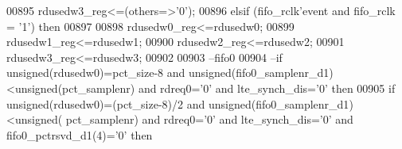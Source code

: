 \begin{DoxyCode}
00895           \textcolor{vhdlchar}{rdusedw3_reg}\textcolor{vhdlchar}{<=}\textcolor{vhdlchar}{(}\textcolor{keywordflow}{others}\textcolor{vhdlchar}{=}\textcolor{vhdlchar}{>}\textcolor{vhdlchar}{'}\textcolor{vhdllogic}{}\textcolor{vhdllogic}{0}\textcolor{vhdlchar}{'}\textcolor{vhdlchar}{)};
00896         \textcolor{keywordflow}{elsif} \textcolor{vhdlchar}{(}\textcolor{vhdlchar}{fifo_rclk}\textcolor{vhdlchar}{'}\textcolor{vhdlkeyword}{event} \textcolor{keywordflow}{and} \textcolor{vhdlchar}{fifo_rclk} \textcolor{vhdlchar}{=} \textcolor{vhdlchar}{'}\textcolor{vhdllogic}{}\textcolor{vhdllogic}{1}\textcolor{vhdlchar}{'}\textcolor{vhdlchar}{)} \textcolor{keywordflow}{then}
00897 
00898          \textcolor{vhdlchar}{rdusedw0_reg}\textcolor{vhdlchar}{<=}\textcolor{vhdlchar}{rdusedw0};
00899         \textcolor{vhdlchar}{rdusedw1_reg}\textcolor{vhdlchar}{<=}\textcolor{vhdlchar}{rdusedw1};
00900         \textcolor{vhdlchar}{rdusedw2_reg}\textcolor{vhdlchar}{<=}\textcolor{vhdlchar}{rdusedw2};
00901           \textcolor{vhdlchar}{rdusedw3_reg}\textcolor{vhdlchar}{<=}\textcolor{vhdlchar}{rdusedw3};
00902          
00903 \textcolor{keyword}{            --fifo0}
00904 \textcolor{keyword}{          --if unsigned(rdusedw0)=pct\_size-8 and unsigned(fifo0\_samplenr\_d1)<unsigned(pct\_samplenr) and
       rdreq0='0' and lte\_synch\_dis='0' then }
00905            \textcolor{keywordflow}{if} \textcolor{comment}{unsigned}\textcolor{vhdlchar}{(}\textcolor{vhdlchar}{rdusedw0}\textcolor{vhdlchar}{)}\textcolor{vhdlchar}{=}\textcolor{vhdlchar}{(}\textcolor{vhdlchar}{pct_size}\textcolor{vhdlchar}{-}\textcolor{vhdllogic}{}\textcolor{vhdllogic}{8}\textcolor{vhdlchar}{)}\textcolor{vhdlchar}{/}\textcolor{vhdllogic}{}\textcolor{vhdllogic}{2} \textcolor{keywordflow}{and} \textcolor{comment}{unsigned}\textcolor{vhdlchar}{(}\textcolor{vhdlchar}{fifo0_samplenr_d1}\textcolor{vhdlchar}{)}\textcolor{vhdlchar}{<}\textcolor{comment}{unsigned}\textcolor{vhdlchar}{(}\textcolor{vhdlchar}{
      pct_samplenr}\textcolor{vhdlchar}{)} \textcolor{keywordflow}{and} \textcolor{vhdlchar}{rdreq0}\textcolor{vhdlchar}{=}\textcolor{vhdlchar}{'}\textcolor{vhdllogic}{}\textcolor{vhdllogic}{0}\textcolor{vhdlchar}{'} \textcolor{keywordflow}{and} \textcolor{vhdlchar}{lte_synch_dis}\textcolor{vhdlchar}{=}\textcolor{vhdlchar}{'}\textcolor{vhdllogic}{}\textcolor{vhdllogic}{0}\textcolor{vhdlchar}{'} \textcolor{keywordflow}{and} \textcolor{vhdlchar}{fifo0_pctrsvd_d1}\textcolor{vhdlchar}{(}\textcolor{vhdllogic}{}\textcolor{vhdllogic}{4}\textcolor{vhdlchar}{)}\textcolor{vhdlchar}{=}\textcolor{vhdlchar}{'}\textcolor{vhdllogic}{}\textcolor{vhdllogic}{0}\textcolor{vhdlchar}{'} \textcolor{keywordflow}{then}   

\end{DoxyCode}
